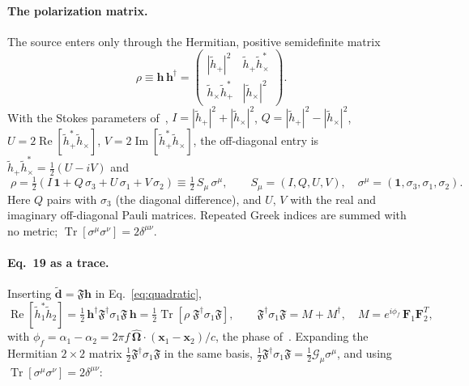\documentclass[11pt]{article}
\newcommand{\Tr}{\operatorname{Tr}}
\renewcommand{\Re}{\operatorname{Re}}
\renewcommand{\Im}{\operatorname{Im}}
\newcommand{\bh}{\bm{h}}
\newcommand{\bF}{\bm{F}}
\newcommand{\bOmega}{\hat{\bm{\Omega}}}
\newcommand{\cG}{\mathcal{G}}
\newcommand{\cF}{\mathfrak{F}}
\newcommand{\ft}[1]{\tilde{#1}}
\theoremstyle{remark}
\begin{document}
\paragraph{The polarization matrix.}
The source enters only through the Hermitian, positive semidefinite matrix
\begin{equation}
  \rho \equiv \bh\, \bh^\dagger
  = \begin{pmatrix}
      |\ft h_+|^2 & \ft h_+ \ft h_\times^* \\
      \ft h_\times \ft h_+^* & |\ft h_\times|^2
    \end{pmatrix}.
\end{equation}
With the Stokes parameters of~\cite[Eq.~18]{Zhong2026},
$I = |\ft h_+|^2 + |\ft h_\times|^2$, $Q = |\ft h_+|^2 - |\ft h_\times|^2$,
$U = 2\Re[\ft h_+^* \ft h_\times]$, $V = 2\Im[\ft h_+^* \ft h_\times]$, the
off-diagonal entry is $\ft h_+ \ft h_\times^* = \tfrac12 (U - iV)$ and
\begin{equation}
  \boxed{\;
  \rho = \tfrac12 \left( I\,\mathbf 1 + Q\,\sigma_3 + U\,\sigma_1 + V\,\sigma_2 \right)
  \equiv \tfrac12\, S_\mu\, \sigma^\mu ,
  \qquad
  S_\mu = (I, Q, U, V), \quad
  \sigma^\mu = (\mathbf 1, \sigma_3, \sigma_1, \sigma_2) .
  \;}
  \label{eq:rho}
\end{equation}
Here $Q$ pairs with $\sigma_3$ (the diagonal difference), and $U$, $V$ with the
real and imaginary off-diagonal Pauli matrices. Repeated Greek indices are
summed with no metric; $\Tr[\sigma^\mu \sigma^\nu] = 2\delta^{\mu\nu}$.

\paragraph{Eq.~19 as a trace.}
Inserting $\ft{\bm d} = \cF\bh$ in Eq.~\eqref{eq:quadratic},
\begin{equation}
  \Re\!\left[\ft h_1^* \ft h_2\right]
  = \tfrac12\, \bh^\dagger \cF^\dagger \sigma_1 \cF\, \bh
  = \tfrac12 \Tr\!\left[\rho\; \cF^\dagger \sigma_1 \cF\right],
  \qquad
  \cF^\dagger \sigma_1 \cF = M + M^\dagger, \quad
  M = e^{i\phi_f}\, \bF_1 \bF_2^T ,
  \label{eq:trace}
\end{equation}
with $\phi_f = \alpha_1 - \alpha_2 = 2\pi f\, \bOmega\cdot(\bm x_1 - \bm x_2)/c$, the
phase of~\cite{Zhong2026}. Expanding the Hermitian $2\times2$ matrix
$\tfrac12 \cF^\dagger\sigma_1\cF$ in the same basis,
$\tfrac12\cF^\dagger\sigma_1\cF = \tfrac12 \cG_\mu \sigma^\mu$, and using
$\Tr[\sigma^\mu\sigma^\nu] = 2\delta^{\mu\nu}$:
\end{document}
